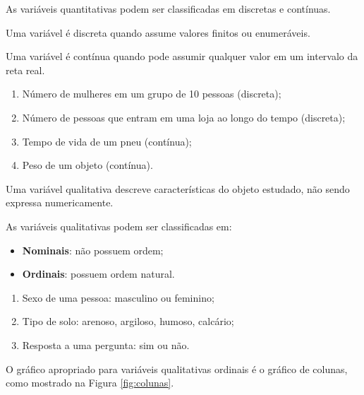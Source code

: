 \inic As variáveis quantitativas podem ser classificadas em discretas e contínuas.

\begin{defin}
Uma variável é discreta quando assume valores finitos ou enumeráveis.
\end{defin}

\begin{defin}
Uma variável é contínua quando pode assumir qualquer valor em um intervalo da reta real.
\end{defin}

\noindent \exemplo
\begin{enumerate}
    \item[(i)] Número de mulheres em um grupo de 10 pessoas (discreta);
    
    \item[(ii)] Número de pessoas que entram em uma loja ao longo do tempo (discreta);
    
    \item[(iii)] Tempo de vida de um pneu (contínua);
    
    \item[(iv)] Peso de um objeto (contínua).
\end{enumerate}

\begin{defin}
Uma variável qualitativa descreve características do objeto estudado, não sendo expressa numericamente.
\end{defin}

As variáveis qualitativas podem ser classificadas em:
\begin{itemize}
    \item \textbf{Nominais}: não possuem ordem;
    \item \textbf{Ordinais}: possuem ordem natural.
\end{itemize}

\noindent \exemplo
\begin{enumerate}
    \item[(i)] Sexo de uma pessoa: masculino ou feminino;
    
    \item[(ii)] Tipo de solo: arenoso, argiloso, humoso, calcário;
    
    \item[(iii)] Resposta a uma pergunta: sim ou não.
\end{enumerate}

\inic O gráfico apropriado para variáveis qualitativas ordinais é o gráfico de colunas, como mostrado na Figura \ref{fig:colunas}.

